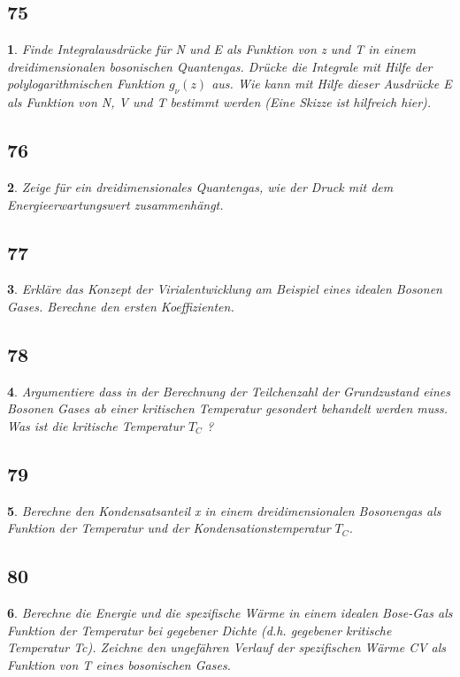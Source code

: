 \documentclass[12pt,a4paper]{report}
\newtheorem{myfrag}{}%
\begin{document}
\subsection{75}
\begin{myfrag}
Finde Integralausdrücke für N und E als Funktion von z und T in einem
dreidimensionalen bosonischen Quantengas. Drücke die Integrale mit Hilfe
der polylogarithmischen Funktion $g_\nu (z)$  aus. Wie kann mit Hilfe dieser
Ausdrücke E als Funktion von N, V und T bestimmt werden (Eine Skizze ist
hilfreich hier).
\end{myfrag}
\subsection{76}
\begin{myfrag}
Zeige für ein dreidimensionales Quantengas, wie der Druck mit dem
Energieerwartungswert zusammenhängt.
\end{myfrag}
\subsection{77}
\begin{myfrag}
Erkläre das Konzept der Virialentwicklung am Beispiel eines idealen
Bosonen Gases. Berechne den ersten Koeffizienten.
\end{myfrag}
\subsection{78}
\begin{myfrag}
Argumentiere dass in der Berechnung der Teilchenzahl der Grundzustand
eines Bosonen Gases ab einer kritischen Temperatur gesondert behandelt
werden muss. Was ist die kritische Temperatur  $T_C$ ?
\end{myfrag}
\subsection{79}
\begin{myfrag}
Berechne den Kondensatsanteil x in einem dreidimensionalen Bosonengas als
Funktion der Temperatur und der Kondensationstemperatur $T_C$.
\end{myfrag}
\subsection{80}
\begin{myfrag}
Berechne die Energie und die spezifische Wärme in einem idealen Bose-Gas
als Funktion der Temperatur bei gegebener Dichte (d.h. gegebener kritische
Temperatur Tc). Zeichne den ungefähren Verlauf der spezifischen Wärme CV
als Funktion von T eines bosonischen Gases.
\end{myfrag}
\end{document}
